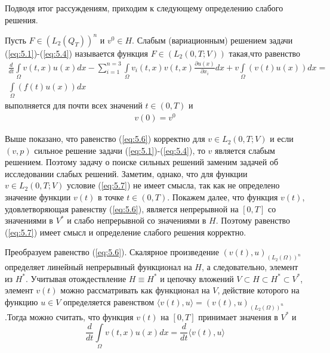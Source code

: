 Подводя итог рассуждениям, приходим к следующему определению слабого решения.
\begin{definition}
    Пусть $F\in (L_2(Q_T))^n$ и $v^0\in H$. Слабым (вариационным) решением задачи (\ref{eq:5.1})-(\ref{eq:5.4}) называется функция $F\in (L_2(0,T;V))$ такая,что равенство
    \begin{equation}\label{eq:5.6}
        \begin{gathered}
            \frac{d}{dt}\int\limits_\Omega v(t,x)u(x)dx-\sum_{i=1}^{n=3}\int\limits_\Omega v_i(t,x)v(t,x)\frac{\partial u(x)}{\partial x_i}dx+v\int\limits_\Omega(v(t)u(x))dx= \\
            \int\limits_\Omega(f(t)u(x))dx
        \end{gathered}
    \end{equation}
    выполняется для почти всех значений $t \in (0, T)$ и
    \begin{equation}\label{eq:5.7}
        \begin{gathered}
            v(0) = v^0
        \end{gathered}
    \end{equation}
\end{definition}

Выше показано, что равенство (\ref{eq:5.6}) корректно для $v \in L_2(0, T; V)$ и если $(v, p)$  сильное решение задачи (\ref{eq:5.1})-(\ref{eq:5.4}),
то $v$ является слабым решением. Поэтому задачу о поиске сильных решений заменим задачей об исследовании слабых решений.
Заметим, однако, что для функции $v \in L_2(0, T; V)$ условие (\ref{eq:5.7}) не имеет смысла, так как не определено значение функции $v(t)$ в точке
$t \in (0, T)$. Покажем далее, что функция $v(t)$, удовлетворяющая равенству (\ref{eq:5.6}), является непрерывной на $[0, T]$ со значениями в $V^\ast$ и слабо
непрерывной со значениями в $H$. Поэтому равенство (\ref{eq:5.7}) имеет смысл и определение слабого решения корректно.

Преобразуем равенство (\ref{eq:5.6}). Скалярное произведение $(v(t), u)_{(L_2(\Omega))^n}$ определяет линейный непрерывный функционал на $H$, а следовательно,
элемент из $H^\ast$. Учитывая отождествление $H \equiv H^\ast$ и цепочку вложений $V \subset H \subset H^\ast \subset V^\ast$,
элемент $v(t)$ можно рассматривать как функционал на $V$, действие которого на функцию $u \in V$ определяется равенством 
$\langle v(t), u \rangle = (v(t), u)_{(L_2(\Omega))^n}$.Тогда можно считать, что функция $v(t)$ на $[0, T]$ принимает значения в $V^\ast$ и
$$\frac{d}{dt}\int\limits_\Omega v(t,x)u(x)dx=\frac{d}{dt}\langle v(t),u \rangle$$

